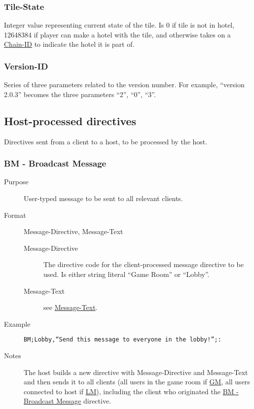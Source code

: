 \documentclass{article}
\providecommand{\wiredata}[1]{\texttt{{#1}}}
\begin{document}

\subsubsection{Tile-State} %
\label{ssub:tile_state}

Integer value representing current state of the tile. Is 0 if tile is not in hotel, 12648384 if player can make a hotel with the tile, and otherwise takes on a \hyperref[ssub:chain_id]{Chain-ID} to indicate the hotel it is part of.


\subsubsection{Version-ID} %
\label{ssub:version_id}

Series of three parameters related to the version number. For example, ``version 2.0.3'' becomes the three parameters ``2'', ``0'', ``3''.



\subsection{Host-processed directives} %
\label{sub:host_processed_directives}

Directives sent from a client to a host, to be processed by the host.

\subsubsection{BM - Broadcast Message} %
\label{ssub:bm_broadcast_message}

\begin{description}
  \item[Purpose] User-typed message to be sent to all relevant clients.
  \item[Format] Message-Directive, Message-Text
  \begin{description}
    \item[Message-Directive] The directive code for the client-processed message directive to be used. Is either string literal ``Game Room'' or ``Lobby''.
    \item[Message-Text] see \hyperref[ssub:message_text]{Message-Text}.
  \end{description}
  \item[Example] \wiredata{BM;Lobby,``Send this message to everyone in the lobby!'';:}
  \item[Notes] The host builds a new directive with Message-Directive and Message-Text and then sends it to all clients (all users in the game room if \hyperref[ssub:gm_game_message]{GM}, all users connected to host if \hyperref[ssub:lm_lobby_message]{LM}), including the client who originated the \hyperref[ssub:bm_broadcast_message]{BM - Broadcast Message} directive.
\end{description}
\end{document}
